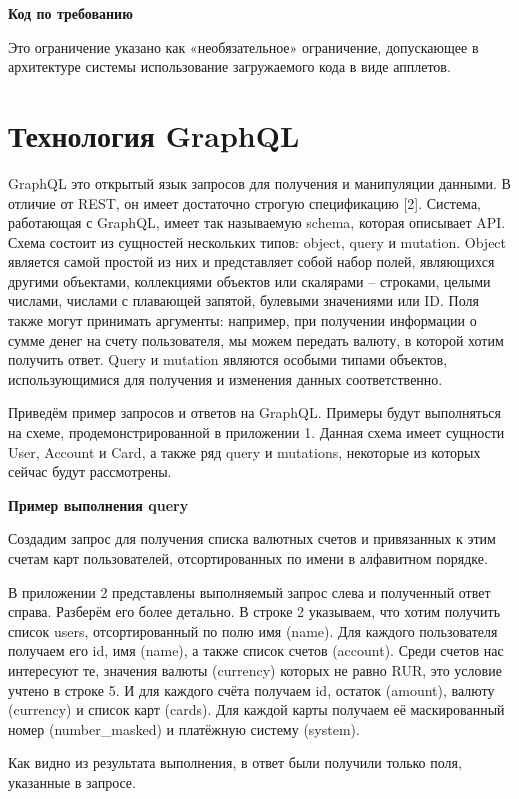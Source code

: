 \textbf{Код по требованию}

Это ограничение указано как «необязательное» ограничение, допускающее в архитектуре системы использование загружаемого кода в виде апплетов.


\section{Технология GraphQL}\label{sec:graphql}

GraphQL это открытый язык запросов для получения и манипуляции данными.
В отличие от REST, он имеет достаточно строгую спецификацию [2].
Система, работающая с GraphQL, имеет так называемую schema, которая описывает API. Схема состоит из сущностей нескольких типов: object, query и mutation.
Object является самой простой из них и представляет собой набор полей, являющихся другими объектами, коллекциями объектов или скалярами – строками, целыми числами, числами с плавающей запятой, булевыми значениями или ID. Поля также могут принимать аргументы: например, при получении информации о сумме денег на счету пользователя, мы можем передать валюту, в которой хотим получить ответ.
Query и mutation являются особыми типами объектов, использующимися для получения и изменения данных соответственно.

Приведём пример запросов и ответов на GraphQL. Примеры будут выполняться на схеме, продемонстрированной в приложении 1.
Данная схема имеет сущности User, Account и Card, а также ряд query и mutations, некоторые из которых сейчас будут рассмотрены.

\textbf{Пример выполнения query}

Создадим запрос для получения списка валютных счетов и привязанных к этим счетам карт пользователей, отсортированных по имени в алфавитном порядке.

В приложении 2 представлены выполняемый запрос слева и полученный ответ справа.
Разберём его более детально.
В строке 2 указываем, что хотим получить список users, отсортированный по полю имя (name).
Для каждого пользователя получаем его id, имя (name), а также список счетов (account).
Среди счетов нас интересуют те, значения валюты (currency) которых не равно RUR, это условие учтено в строке 5.
И для каждого счёта получаем id, остаток (amount), валюту (currency) и список карт (cards).
Для каждой карты получаем её маскированный номер (number\_masked) и платёжную систему (system).

Как видно из результата выполнения, в ответ были получили только поля, указанные в запросе.

